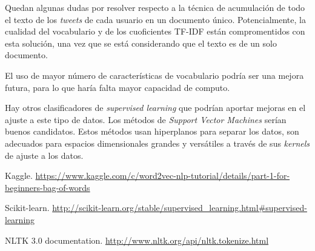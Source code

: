\documentclass[11pt,a4paper]{article}
\begin{document}
  Quedan algunas dudas por resolver respecto a la t\'ecnica de acumulaci\'on de todo el texto de los {\em tweets} de cada usuario en un documento \'unico. Potencialmente, la cualidad del vocabulario y de los cuoficientes TF-IDF est\'an compromentidos con esta soluci\'on, una vez que se est\'a considerando que el texto es de un solo documento.

  El uso de mayor n\'umero de caracter\'isticas de vocabulario podr\'ia ser una mejora futura, para lo que har\'ia falta mayor capacidad de computo.

  Hay otros clasificadores de {\em supervised learning} que podr\'ian aportar mejoras en el ajuste a este tipo de datos. Los m\'etodos de {\em Support Vector Machines} ser\'ian buenos candidatos. Estos m\'etodos usan hiperplanos para separar los datos, son adecuados para espacios dimensionales grandes y vers\'atiles a trav\'es de sus {\em kernels} de ajuste a los datos.


\begin{thebibliography}{}

\bibitem{} Kaggle.
\newblock \url{https://www.kaggle.com/c/word2vec-nlp-tutorial/details/part-1-for-beginners-bag-of-words}

\bibitem{} Scikit-learn.
\newblock \url{http://scikit-learn.org/stable/supervised_learning.html#supervised-learning}

\bibitem{} NLTK 3.0 documentation.
\newblock \url{http://www.nltk.org/api/nltk.tokenize.html}


\end{thebibliography}
\end{document}
